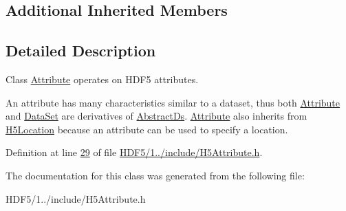 \subsection*{Additional Inherited Members}


\subsection{Detailed Description}
Class \hyperlink{class_h5_1_1_attribute}{Attribute} operates on H\+D\+F5 attributes. 

An attribute has many characteristics similar to a dataset, thus both \hyperlink{class_h5_1_1_attribute}{Attribute} and \hyperlink{class_h5_1_1_data_set}{Data\+Set} are derivatives of \hyperlink{class_h5_1_1_abstract_ds}{Abstract\+Ds}. \hyperlink{class_h5_1_1_attribute}{Attribute} also inherits from \hyperlink{class_h5_1_1_h5_location}{H5\+Location} because an attribute can be used to specify a location. 

Definition at line \hyperlink{_h_d_f5_21_810_81_2include_2_h5_attribute_8h_source_l00029}{29} of file \hyperlink{_h_d_f5_21_810_81_2include_2_h5_attribute_8h_source}{H\+D\+F5/1../include/\+H5\+Attribute.\+h}.



The documentation for this class was generated from the following file\+:\begin{DoxyCompactItemize}
\item 
H\+D\+F5/1../include/\+H5\+Attribute.\+h\end{DoxyCompactItemize}
